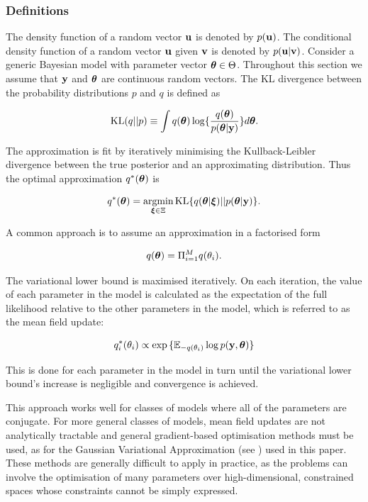 \documentclass{article}[12pt]
\begin{document}
\subsubsection{Definitions}

The density function of a random vector ${\bf u}$ is denoted by $p({\bf u})$.  The conditional density function of a
random vector ${\bf u}$ given ${\bf v}$ is denoted by $p({\bf u}|{\bf v})$. Consider a generic Bayesian model with parameter
vector ${\boldsymbol \theta} \in \Theta$. Throughout this section we assume that ${\bf y}$ and ${\boldsymbol \theta}$ are continuous random
vectors. The KL divergence between the probability distributions $p$ and $q$ is defined as

$$
\text{KL}(q || p) \equiv \int q({\boldsymbol \theta}) \log \{ \frac{q({\boldsymbol \theta})}{p({\boldsymbol \theta} | {\bf y})} \} d {\boldsymbol \theta}.
$$

\noindent The approximation is fit by iteratively minimising the Kullback-Leibler divergence between the true
posterior and an approximating distribution. Thus the optimal approximation $q^*({\boldsymbol \theta})$ is

$$
q^*(\vtheta) = \argmin_{\vxi \in \Xi} \text{KL} \{ {q(\vtheta|\vxi) || p(\vtheta|\vy)} \}.
$$

\noindent A common approach is to assume an approximation in a factorised form

$$q({\boldsymbol \theta}) = \Pi_{i=1}^M q(\theta_i).$$

\noindent The variational lower bound is maximised iteratively. On each iteration, the value of each parameter
in the model is calculated as the expectation of the full likelihood relative to the other parameters in the
model, which is referred to as the mean field update:

$$q_i^*(\theta_i) \propto \exp{\{ {\mathbb E}_{-q(\theta_i)} \log p({\bf y}, {\boldsymbol\theta}) \}}$$

\noindent This is done for each parameter in the model in turn until the variational lower bound's increase is
negligible and convergence is achieved.

\noindent This approach works well for classes of models where all of the parameters are conjugate. For more
general classes of models, mean field updates are not analytically tractable and general gradient-based
optimisation methods must be used, as for the Gaussian Variational Approximation (see \cite{ormerod09}) used
in this paper. These methods are generally difficult to apply in practice, as the problems can involve the
optimisation of many parameters over high-dimensional, constrained spaces whose constraints cannot be simply
expressed.
\end{document}
